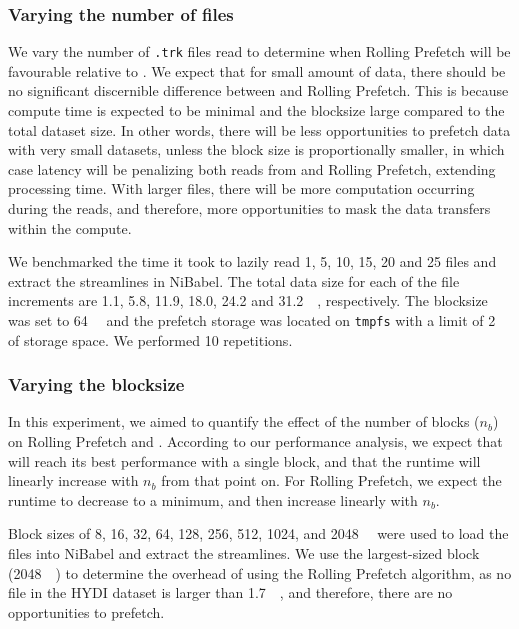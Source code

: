 \subsubsection{Varying the number of files}\label{exp:rp:files}

We vary the number of \texttt{.trk} files read to determine when Rolling
Prefetch will be favourable relative to \sfs. We expect that for small amount of
data, there should be no significant discernible difference between \sfs and
Rolling Prefetch. This is because compute time is expected to be minimal and the
blocksize large compared to the total dataset size. In other words, there will
be less opportunities to prefetch data with very small datasets, unless the
block size is proportionally smaller, in which case latency will be penalizing
both reads from \sfs and Rolling Prefetch, extending processing time. With
larger files, there will be more computation occurring during the reads, and
therefore, more opportunities to mask the data transfers within the compute.

We benchmarked the time it took to lazily read 1, 5, 10, 15, 20 and 25 files and
extract the streamlines in NiBabel. The total data size for each of the file
increments are 1.1, 5.8, 11.9, 18.0, 24.2 and \SI{31.2}{\gibi\byte},
respectively. The blocksize was set to \SI{64}{\mebi\byte} and the prefetch
storage was located on \texttt{tmpfs} with a limit of \SI{2}{\gibi\byte} of
storage space. We performed 10 repetitions.

\subsubsection{Varying the blocksize}\label{exp:blocksize} In this experiment,
we aimed to quantify the effect of the number of blocks ($n_b$) on Rolling
Prefetch and \sfs. According to our performance analysis, we expect that \sfs
will reach its best performance with a single block, and that the runtime will
linearly increase with $n_b$ from that point on. For Rolling Prefetch, we expect
the runtime to decrease to a minimum, and then increase linearly with $n_b$.


Block sizes of 8, 16, 32, 64, 128, 256, 512, 1024, and \SI{2048}{\mebi\byte}
were used to load the files into NiBabel and extract the streamlines.
We use the largest-sized block (\SI{2048}{\mebi\byte}) to determine the overhead
of using the Rolling Prefetch algorithm, as no file in the HYDI dataset is
larger than \SI{1.7}{\gibi\byte}, and therefore, there are no opportunities to
prefetch.

